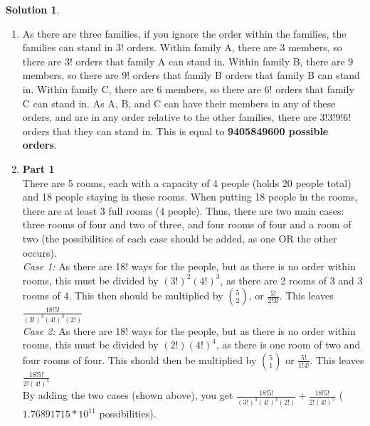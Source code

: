 \documentclass{article}
\theoremstyle{definition}
\newtheorem*{solution}{Solution}
\begin{document}
\begin{solution}
\end{solution}
\begin{enumerate}[label = \alph*)]
    \item 
    As there are three families, if you ignore the order within the families, the families can stand in $3!$ orders. Within family A, there are 3 members, so there are 3! orders that family A can stand in. Within family B, there are 9 members, so there are 9! orders that family B orders that family B can stand in. Within family C, there are 6 members, so there are 6! orders that family C can stand in. As A, B, and C can have their members in any of these orders, and are in any order relative to the other families, there are $3!3!9!6!$ orders that they can stand in. This is equal to \textbf{9405849600 possible orders}.
    
    \item
    \textbf{Part 1}\\
    There are 5 rooms, each with a capacity of 4 people (holds 20 people total) and 18 people staying in these rooms. When putting 18 people in the rooms, there are at least 3 full rooms (4 people). Thus, there are two main cases: three rooms of four and two of three, and four rooms of four and a room of two (the possibilities of each case should be added, as one OR the other occurs). \\
    \emph{Case 1:} As there are 18! ways for the people, but as there is no order within rooms, this must be divided by $(3!)^2(4!)^3$, as there are 2 rooms of 3 and 3 rooms of 4. This then should be multiplied by $\binom{5}{2}$, or $\frac{5!}{2!3!}$. This leaves $\frac{18!5!}{(3!)^3(4!)^3(2!)}$\\
    \emph{Case 2:} As there are 18! ways for the people, but as there is no order within rooms, this must be divided by $(2!)(4!)^4$, as there is one room of two and four rooms of four. This should then be multiplied by $\binom{5}{1}$ or $\frac{5!}{1!4!}$. This leaves $\frac{18!5!}{2!(4!)^5}$\\
    By adding the two cases (shown above), you get $\frac{18!5!}{(3!)^3(4!)^3(2!)} + \frac{18!5!}{2!(4!)^5}$ ($1.76891715*10^11$ possibilities).\\
    

\end{enumerate}
\end{document}
